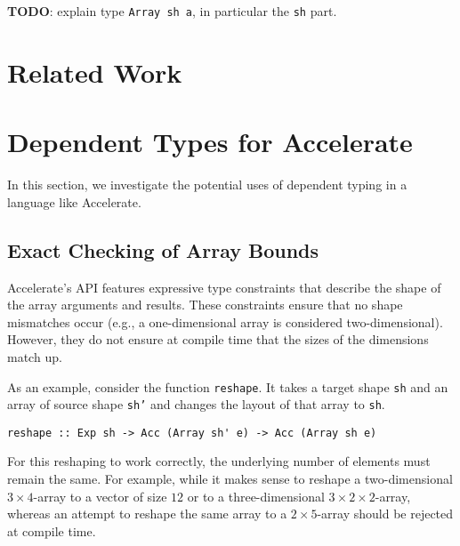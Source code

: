 \documentclass{llncs}
\begin{document}
\textbf{TODO}: explain type \texttt{Array sh a}, in particular the
\texttt{sh} part.

\section{Related Work}
\label{sec:related-work}

\section{Dependent Types for Accelerate}
\label{sec:dependent-types}

In this section, we investigate the potential uses of dependent typing
in a language like Accelerate.

\subsection{Exact Checking of Array Bounds}
\label{sec:exact-checking-array}

Accelerate's API features expressive type constraints that describe
the shape of the array arguments and results. These constraints ensure
that no shape mismatches occur (e.g., a one-dimensional array is
considered two-dimensional). However, they do not ensure at compile
time that the sizes of the dimensions match up.

As an example, consider the function \texttt{reshape}. 
It takes a target shape \texttt{sh} and an array of source shape
\texttt{sh'} and changes the layout of that array to \texttt{sh}. 
\begin{verbatim}
reshape :: Exp sh -> Acc (Array sh' e) -> Acc (Array sh e)
\end{verbatim}
For this reshaping to work correctly, the underlying
number of elements must remain the same. For example, while it makes sense
to reshape a two-dimensional $3\times 4$-array  to a vector of size
$12$ or to a three-dimensional $3\times2\times2$-array, whereas an attempt to
reshape the same array to a $2\times5$-array should be rejected at
compile time.
\end{document}
